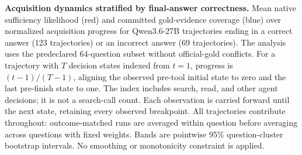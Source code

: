 \textbf{Acquisition dynamics stratified by final-answer correctness.} Mean native sufficiency likelihood (red) and committed gold-evidence coverage (blue) over normalized acquisition progress for Qwen3.6-27B trajectories ending in a correct answer (123 trajectories) or an incorrect answer (69 trajectories). The analysis uses the predeclared 64-question subset without official-gold conflicts. For a trajectory with $T$ decision states indexed from $t=1$, progress is $(t-1)/(T-1)$, aligning the observed pre-tool initial state to zero and the last pre-finish state to one. The index includes search, read, and other agent decisions; it is not a search-call count. Each observation is carried forward until the next state, retaining every observed breakpoint. All trajectories contribute throughout: outcome-matched runs are averaged within question before averaging across questions with fixed weights. Bands are pointwise 95\% question-cluster bootstrap intervals. No smoothing or monotonicity constraint is applied.
